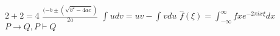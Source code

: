 $2+2=4$
$\frac{(-b \pm(\sqrt{b^2-4ac})}{2a}$
$\int_{}^{}udv = uv - \int_{}^{}vdu$
$\hat{f}(\xi)=\int_{-\infty}^{\infty}fxe^{-2\pi ix\xi}dx$
$P\rightarrow Q, P\vdash Q$